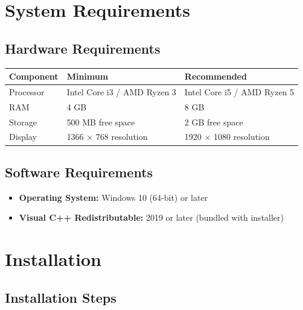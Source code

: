 \documentclass[12pt,a4paper]{report}
\begin{document}
\chapter{System Requirements}

\section{Hardware Requirements}

\begin{longtable}{@{}p{4cm}p{5cm}p{5cm}@{}}
\toprule
\textbf{Component} & \textbf{Minimum} & \textbf{Recommended} \\
\midrule
\endhead
Processor & Intel Core i3 / AMD Ryzen 3 & Intel Core i5 / AMD Ryzen 5 \\
RAM & 4 GB & 8 GB \\
Storage & 500 MB free space & 2 GB free space \\
Display & 1366 × 768 resolution & 1920 × 1080 resolution \\
\bottomrule
\end{longtable}

\section{Software Requirements}

\begin{itemize}[leftmargin=*]
    \item \textbf{Operating System:} Windows 10 (64-bit) or later
    \item \textbf{Visual C++ Redistributable:} 2019 or later (bundled with installer)
\end{itemize}

\chapter{Installation}

\section{Installation Steps}
\end{document}
